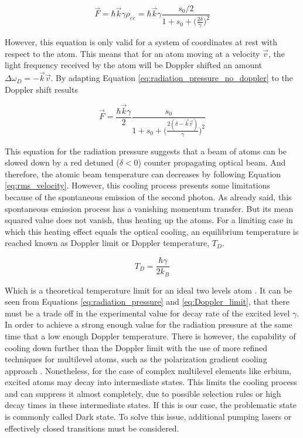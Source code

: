 \begin{equation}\label{eq:radiation_pressure_no_doppler}
	\vec{F} = \hbar \vec{k} \gamma \rho_{ee} = \hbar \vec{k} \gamma \frac{s_0/2}{1 + s_0 + \Big(\frac{2\delta}{\gamma}\Big)^2}
\end{equation}

However, this equation is only valid for a system of coordinates at rest with respect to the atom. This means that for an atom moving at a velocity $\vec{v}$, the light frequency received by the atom will be Doppler shifted an amount  $\Delta \omega_D = -\vec{k}\vec{v}$. By adapting Equation \eqref{eq:radiation_pressure_no_doppler} to the Doppler shift results

 \begin{equation}\label{eq:radiation_pressure}
 	\vec{F} = \frac{\hbar \vec{k} \gamma}{2} \frac{s_0}{1 + s_0 + \Big(\frac{2(\delta-\vec{k}\vec{v})}{\gamma}\Big)^2}
 \end{equation}

This equation for the radiation pressure suggests that a beam of atoms can be slowed down by a red detuned ($\delta < 0$) counter propagating optical beam. And therefore, the atomic beam temperature can decreases by following Equation \eqref{eq:rms_velocity}. However, this cooling process presents some limitations because of the spontaneous emission of the second photon. As already said, this spontaneous emission process has a vanishing momentum transfer. But its mean squared value does not vanish, thus heating up the atoms. For a limiting case in which this heating effect equals the optical cooling, an equilibrium temperature is reached known as Doppler limit or Doppler temperature, $T_D$.

\begin{equation}\label{eq:Doppler_limit}
	T_D = \frac{\hbar \gamma}{2 k_B}
\end{equation}

Which is a theoretical temperature limit for an ideal two levels atom \cite{Metcalf1999}. It can be seen from Equations \eqref{eq:radiation_pressure} and \eqref{eq:Doppler_limit}, that there must be a trade off in the experimental value for decay rate of the excited level $\gamma$. In order to achieve a strong enough value for the radiation pressure at the same time that a low enough Doppler temperature. There is however, the capability of cooling down further than the Doppler limit with the use of more refined techniques for multilevel atoms, such as the polarization gradient cooling approach \cite{Dalibard1989}. Nonetheless, for the case of complex multilevel elements like erbium, excited atoms may decay into intermediate states. This limits the cooling process and can suppress it almost completely, due to possible selection rules or high decay times in these intermediate states. If this is our case, the problematic state is commonly called Dark state. To solve this issue, additional pumping lasers or effectively closed transitions must be considered.

